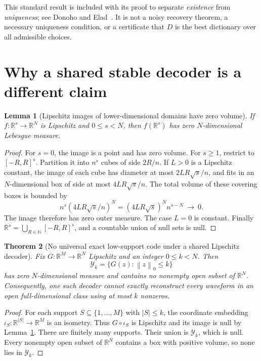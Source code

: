 \documentclass[11pt,a4paper]{article}
\newtheorem{theorem}{Theorem}
\newtheorem{lemma}[theorem]{Lemma}
\theoremstyle{definition}
\theoremstyle{remark}
\newcommand{\R}{\mathbb R}
\newcommand{\N}{\mathbb N}
\newcommand{\norm}[1]{\left\lVert#1\right\rVert}
\begin{document}
This standard result is included with its proof to separate \emph{existence}
from \emph{uniqueness}; see Donoho and Elad~\cite{donoho2003}. It is not a noisy
recovery theorem, a necessary uniqueness condition, or a certificate that $D$
is the best dictionary over all admissible choices.

\section{Why a shared stable decoder is a different claim}

\begin{lemma}[Lipschitz images of lower-dimensional domains have zero volume]\label{lem:null}
If $f:\R^s\to\R^N$ is Lipschitz and $0\leq s<N$, then
$f(\R^s)$ has zero $N$-dimensional Lebesgue measure.
\end{lemma}
\begin{proof}
For $s=0$, the image is a point and has zero volume. For $s\geq1$, restrict to
$[-R,R]^s$. Partition it into $n^s$ cubes of side $2R/n$. If $L>0$ is a
Lipschitz constant, the image of each cube has diameter at most
$2LR\sqrt{s}/n$, and fits in an $N$-dimensional box of side at most
$4LR\sqrt{s}/n$. The total volume of these covering boxes is bounded by
\[
n^s(4LR\sqrt{s}/n)^N=(4LR\sqrt{s})^N n^{s-N}\ \longrightarrow\ 0.
\]
The image therefore has zero outer measure. The case $L=0$ is constant.
Finally $\R^s=\bigcup_{R\in\N}[-R,R]^s$, and a countable union of null sets is null.
\end{proof}

\begin{theorem}[No universal exact low-support code under a shared Lipschitz decoder]\label{thm:uniform}
Fix $G:\R^M\to\R^N$ Lipschitz and an integer $0\leq k<N$. Then
\[
\mathcal Y_k=\{G(z):\norm{z}_0\leq k\}
\]
has zero $N$-dimensional measure and contains no nonempty open subset of $\R^N$.
Consequently, one such decoder cannot exactly reconstruct every waveform in an
open full-dimensional class using at most $k$ nonzeros.
\end{theorem}
\begin{proof}
For each support $S\subseteq\{1,\ldots,M\}$ with $|S|\leq k$, the coordinate
embedding $\iota_S:\R^{|S|}\to\R^M$ is an isometry. Thus $G\circ\iota_S$ is
Lipschitz and its image is null by Lemma~\ref{lem:null}. There are finitely many
supports. Their union is $\mathcal Y_k$, which is null. Every nonempty open
subset of $\R^N$ contains a box with positive volume, so none lies in $\mathcal Y_k$.
\end{proof}
\end{document}
